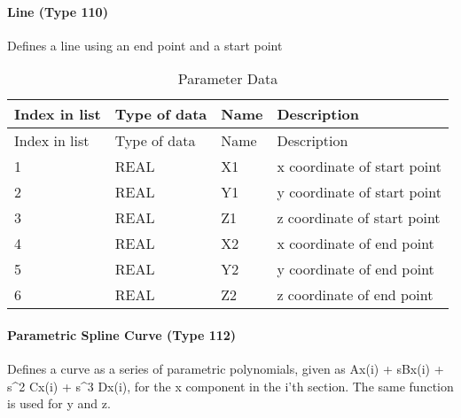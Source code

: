 \paragraph{Line (Type 110)}\label{line-type-110}

Defines a line using an end point and a start point

\begin{longtable}[c]{@{}llll@{}}
\caption{Parameter Data}\tabularnewline
\toprule
Index in list & Type of data & Name & Description\tabularnewline
\midrule
\endfirsthead
\toprule
Index in list & Type of data & Name & Description\tabularnewline
\midrule
\endhead
1 & REAL & X1 & x coordinate of start point\tabularnewline
2 & REAL & Y1 & y coordinate of start point\tabularnewline
3 & REAL & Z1 & z coordinate of start point\tabularnewline
4 & REAL & X2 & x coordinate of end point\tabularnewline
5 & REAL & Y2 & y coordinate of end point\tabularnewline
6 & REAL & Z2 & z coordinate of end point\tabularnewline
\bottomrule
\end{longtable}

\paragraph{Parametric Spline Curve (Type
112)}\label{parametric-spline-curve-type-112}

Defines a curve as a series of parametric polynomials, given as Ax(i) +
sBx(i) + s\^{}2 Cx(i) + s\^{}3 Dx(i), for the x component in the i'th
section. The same function is used for y and z.

